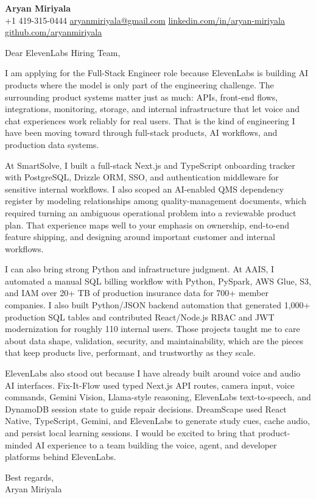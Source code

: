 \documentclass[letterpaper,11pt]{article}
\begin{document}
\begin{center}
    {\Large \textbf{Aryan Miriyala}}\\
    \vspace{2pt}
    +1 419-315-0444 \textbar{} \href{mailto:aryanmiriyala@gmail.com}{aryanmiriyala@gmail.com} \textbar{} \href{https://www.linkedin.com/in/aryan-miriyala-7788a21b6/}{linkedin.com/in/aryan-miriyala} \textbar{} \href{https://github.com/aryanmiriyala}{github.com/aryanmiriyala}
\end{center}

\vspace{10pt}

Dear ElevenLabs Hiring Team,

I am applying for the Full-Stack Engineer role because ElevenLabs is building AI products where the model is only part of the engineering challenge. The surrounding product systems matter just as much: APIs, front-end flows, integrations, monitoring, storage, and internal infrastructure that let voice and chat experiences work reliably for real users. That is the kind of engineering I have been moving toward through full-stack products, AI workflows, and production data systems.

At SmartSolve, I built a full-stack Next.js and TypeScript onboarding tracker with PostgreSQL, Drizzle ORM, SSO, and authentication middleware for sensitive internal workflows. I also scoped an AI-enabled QMS dependency register by modeling relationships among quality-management documents, which required turning an ambiguous operational problem into a reviewable product plan. That experience maps well to your emphasis on ownership, end-to-end feature shipping, and designing around important customer and internal workflows.

I can also bring strong Python and infrastructure judgment. At AAIS, I automated a manual SQL billing workflow with Python, PySpark, AWS Glue, S3, and IAM over 20+ TB of production insurance data for 700+ member companies. I also built Python/JSON backend automation that generated 1,000+ production SQL tables and contributed React/Node.js RBAC and JWT modernization for roughly 110 internal users. Those projects taught me to care about data shape, validation, security, and maintainability, which are the pieces that keep products live, performant, and trustworthy as they scale.

ElevenLabs also stood out because I have already built around voice and audio AI interfaces. Fix-It-Flow used typed Next.js API routes, camera input, voice commands, Gemini Vision, Llama-style reasoning, ElevenLabs text-to-speech, and DynamoDB session state to guide repair decisions. DreamScape used React Native, TypeScript, Gemini, and ElevenLabs to generate study cues, cache audio, and persist local learning sessions. I would be excited to bring that product-minded AI experience to a team building the voice, agent, and developer platforms behind ElevenLabs.

\vspace{8pt}

Best regards,\\
Aryan Miriyala
\end{document}
